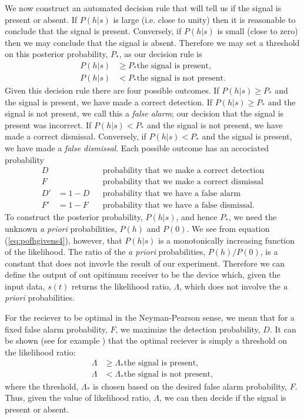 We now construct an automated decision rule that will tell us if the signal is
present or absent.  If $P(h|s)$ is large (i.e.  close to unity) then it is
reasonable to conclude that the signal is present.  Conversely, if $P(h|s)$ is
small (close to zero) then we may conclude that the signal is absent.
Therefore we may set a threshold on this posterior probability, $P_\ast$, as
our decision rule is
\begin{equation}
\begin{split}
P(h|s) &\ge P_* \text{the signal is present}, \\
P(h|s) &< P_* \text{the signal is not present}.
\end{split}
\end{equation}
Given this decision rule there are four possible outcomes. If $P(h|s) \ge
P_*$ and the signal is present, we have made a correct detection. If $P(h|s)
\ge P_*$ and the signal is not present, we call this a \emph{false alarm}; our
decision that the signal is present was incorrect. If $P(h|s) < P_*$ and the
signal is not present, we have made a correct dismissal. Conversely, if
$P(h|s) < P_*$ and the signal is present, we have made a \emph{false
dismissal}. Each possible outcome has an accociated probability
\begin{align}
D & &&\text{probability that we make a correct detection} \\
F & &&\text{probability that we make a correct dismissal} \\
D' &= 1 - D &&\text{probability that we have a false alarm} \\
F' &= 1 - F &&\text{probability that we have a false dismissal}.
\end{align}
To construct the posterior probability, $P(h|s)$, and hence $P_\ast$, we need
the unknown \emph{a priori} probabilities, $P(h)$ and $P(0)$. We see from
equation (\ref{eq:pofhgivens4}), however, that $P(h|s)$ is a monotonically
increasing function of the likelihood. The ratio of the \emph{a priori}
probabilities, $P(h)/P(0)$, is a constant that does not invovle the result of
our experiment. Therefore we can define the output of out opitimum receiver to be
the device which, given the input data, $s(t)$ returns the likelihood ratio,
$\Lambda$, which does not involve the \emph{a priori} probabilities. 

For the reciever to be optimal in the Neyman-Pearson sense, we mean that for a
fixed false alarm probability, $F$, we maximize the detection probability,
$D$. It can be shown (see for example \cite{XXX}) that the optimal
reciever is simply a threshold on the likelihood ratio:
\begin{equation}
\begin{split}
\Lambda &\ge \Lambda_\ast \text{the signal is present}, \\
\Lambda &< \Lambda_\ast \text{the signal is not present},
\end{split}
\end{equation}
where the threshold, $\Lambda_\ast$ is chosen based on the desired false alarm
probability, $F$. Thus, given the value of likelihood ratio, $\Lambda$, we
can then decide if the signal is present or absent. 

